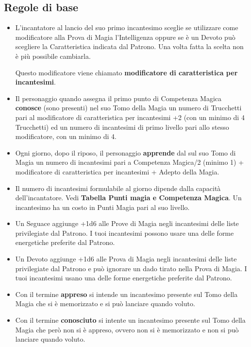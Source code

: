 \begin{multicols}{2}

\subsection{Regole di base}\label{magieregoledibase}

\begin{itemize}[leftmargin=*] \setlength{\itemsep}{0pt}

\item
L'incantatore al lancio del suo primo incantesimo sceglie se utilizzare come modificatore alla Prova di Magia l'Intelligenza oppure se è un Devoto può scegliere la Caratteristica indicata dal Patrono. Una volta fatta la scelta non è più possibile cambiarla.

Questo modificatore viene chiamato \textbf{modificatore di caratteristica per incantesimi}.
\item
Il personaggio quando assegna il primo punto di Competenza Magica \textbf{conosce} (sono presenti) nel suo Tomo della Magia un numero di Trucchetti pari al modificatore di caratteristica per incantesimi +2 (con un minimo di 4 Trucchetti) ed un numero di incantesimi di primo livello pari allo stesso modificatore, con un minimo di 4.
\item
Ogni giorno, dopo il riposo, il personaggio \textbf{apprende} dal sul suo Tomo di Magia un numero di incantesimi pari a Competenza Magica/2 (minimo 1) + modificatore di caratteristica per incantesimi + Adepto della Magia.\label{incantesimicm1}\hypertarget{incantesimicm1}{}
\item
Il numero di incantesimi formulabile al giorno dipende dalla capacità dell'incantatore. Vedi \textbf{Tabella Punti magia e Competenza Magica}. Un incantesimo ha un costo in Punti Magia pari al suo livello.
\item
Un Seguace aggiunge +1d6 alle Prove di Magia negli incantesimi delle liste privilegiate dal Patrono. I tuoi incantesimi possono usare una delle forme energetiche preferite dal Patrono.\label{listeprivilegiate}\hypertarget{listeprivilegiate}{}
\item
Un Devoto aggiunge +1d6 alle Prova di Magia negli incantesimi delle liste privilegiate dal Patrono e può ignorare un dado tirato nella Prova di Magia. I tuoi incantesimi usano una delle forme energetiche preferite dal Patrono.
\item
Con il termine \textbf{appreso} si intende un incantesimo presente sul Tomo della Magia che si è memorizzato e si può lanciare quando voluto.
\item
Con il termine \textbf{conosciuto} si intente un incantesimo presente sul Tomo della Magia che però non si è appreso, ovvero non si è memorizzato e non si può lanciare quando voluto.
\end{itemize}


\end{multicols}
